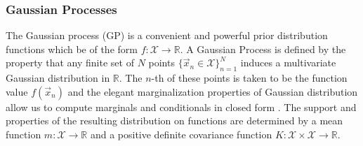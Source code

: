 \documentclass[12pt, a4paper]{article}
\begin{document}
\subsubsection{Gaussian Processes}
The Gaussian process (GP) is a convenient and powerful prior distribution functions which be of the form $f : \mathcal{X} \rightarrow \mathbb{R}$. A Gaussian Process is defined by the property that any finite set of $N$ points $\{ \vec{x}_n \in \mathcal{X}\}_{n=1}^N$ induces a multivariate Gaussian distribution in $\mathbb{R}$. The $n$-th of these points is taken to be the function value $f(\vec{x}_n)$ and the elegant marginalization properties of Gaussian distribution allow us to compute marginals and conditionals in closed form \cite{Snoek2012}. The support and properties of the resulting distribution on functions are determined by a mean function $m : \mathcal{X} \rightarrow \mathbb{R}$ and a positive definite covariance function $K : \mathcal{X} \times \mathcal{X} \rightarrow \mathbb{R}$. 
\end{document}
